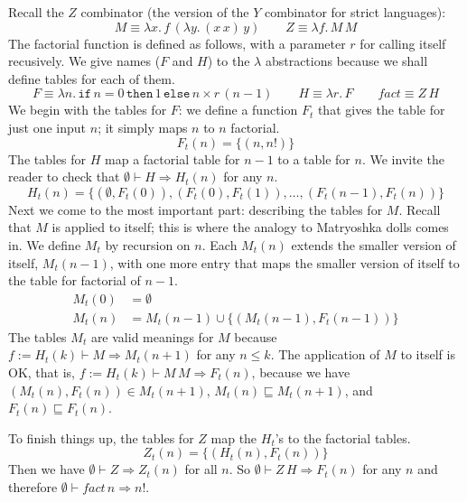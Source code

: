 \documentclass{tufte-handout}
\newcommand{\LAM}[1]{\lambda #1.\,}
\newcommand{\APP}[0]{\,}
\newcommand{\IF}[3]{\mathtt{if}\,#1\,\mathtt{then}\,#2\,\mathtt{else}\,#3}
\begin{document}
Recall the $Z$ combinator (the version of the $Y$ combinator for
strict languages):
\[
  M  \equiv \LAM{x} f \APP (\LAM{y} (x\APP x) \APP y) \qquad
  Z  \equiv \LAM{f} M \APP M 
\]
The factorial function is defined as follows, with a parameter $r$ for
calling itself recusively. We give names ($F$ and $H$) to the
$\lambda$ abstractions because we shall define tables for each of
them.
\[
  F  \equiv \LAM{n} \IF{n=0}{1}{n} \times r \APP (n-1) \qquad
  H \equiv \LAM{r} F \qquad
  \mathit{fact} \equiv Z\APP H
\]
We begin with the tables for $F$: we define a function $F_t$ that
gives the table for just one input $n$; it simply maps $n$ to $n$
factorial.
\[
  F_t(n) = \{ (n,n!) \}
\]
The tables for $H$ map a factorial table for $n-1$ to a table for $n$.
We invite the reader to check that
$\emptyset \vdash H \Rightarrow H_t(n)$ for any $n$.
\[
H_t(n) = \{ (\emptyset, F_t(0)), (F_t(0), F_t(1)), \ldots, (F_t(n-1), F_t(n))\}
\]
Next we come to the most important part: describing the tables for
$M$. Recall that $M$ is applied to itself; this is where the
analogy to Matryoshka dolls comes in.  We define $M_t$ by recursion on
$n$. Each $M_t(n)$ extends the smaller version of itself, $M_t(n-1)$,
with one more entry that maps the smaller version of itself to the
table for factorial of $n-1$.
\begin{align*}
  M_t(0) &= \emptyset \\
  M_t(n) &= M_t(n-1) \cup \{ (M_t(n-1), F_t(n-1)) \}
\end{align*}
The tables $M_t$ are valid meanings for $M$ because $f{:=}H_t(k)
\vdash M \Rightarrow M_t(n+1)$ for any $n \leq k$.
The application of $M$ to itself is OK, that is,
$f{:=}H_t(k) \vdash M\APP M \Rightarrow F_t(n)$,
because we have
$(M_t(n),F_t(n)) \in M_t(n+1)$, 
$M_t(n)\sqsubseteq M_t(n+1)$, and
$F_t(n) \sqsubseteq F_t(n)$.

To finish things up, the tables for $Z$ map the $H_t$'s to the
factorial tables.
\[
  Z_t(n) = \{ (H_t(n), F_t(n)) \}
\]
Then we have $\emptyset \vdash Z \Rightarrow Z_t(n)$ for all $n$.  So
$\emptyset \vdash Z\APP H \Rightarrow F_t(n)$ for any $n$ and
therefore $\emptyset \vdash \mathit{fact}\,n \Rightarrow n!$.
\end{document}
